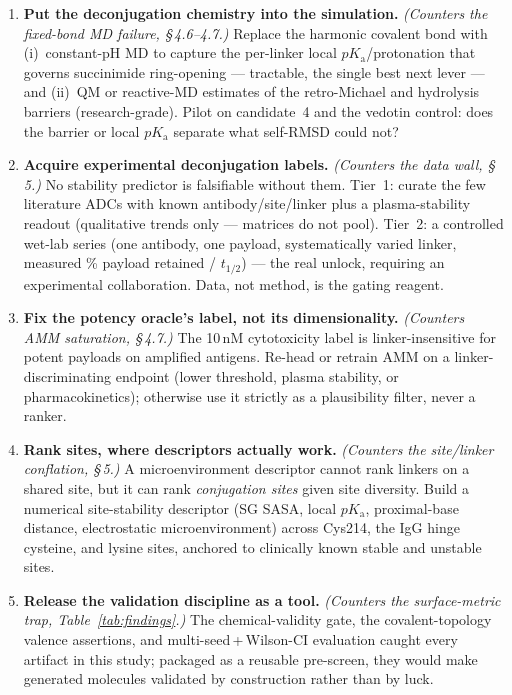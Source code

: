 \documentclass[10pt,twocolumn]{article}
\begin{document}
\begin{enumerate}[leftmargin=1.3em,itemsep=2.5pt,topsep=2pt]
\item \textbf{\color{accent}Put the deconjugation chemistry into the simulation.}
\emph{(Counters the fixed-bond MD failure, \S\,4.6--4.7.)} Replace the harmonic covalent bond with
(i)~constant-pH MD to capture the per-linker local $pK_\mathrm{a}$/protonation that governs succinimide
ring-opening --- tractable, the single best next lever --- and (ii)~QM or reactive-MD estimates of the
retro-Michael and hydrolysis barriers (research-grade). Pilot on candidate~4 and the vedotin control:
does the barrier or local $pK_\mathrm{a}$ separate what self-RMSD could not?

\item \textbf{\color{accent}Acquire experimental deconjugation labels.}
\emph{(Counters the data wall, \S\,5.)} No stability predictor is falsifiable without them. Tier~1:
curate the few literature ADCs with known antibody/site/linker plus a plasma-stability readout
(qualitative trends only --- matrices do not pool). Tier~2: a controlled wet-lab series (one antibody,
one payload, systematically varied linker, measured \% payload retained / $t_{1/2}$) --- the real
unlock, requiring an experimental collaboration. Data, not method, is the gating reagent.

\item \textbf{\color{accent}Fix the potency oracle's label, not its dimensionality.}
\emph{(Counters AMM saturation, \S\,4.7.)} The 10\,nM cytotoxicity label is linker-insensitive for
potent payloads on amplified antigens. Re-head or retrain AMM on a linker-discriminating endpoint (lower
threshold, plasma stability, or pharmacokinetics); otherwise use it strictly as a plausibility filter,
never a ranker.

\item \textbf{\color{accent}Rank sites, where descriptors actually work.}
\emph{(Counters the site/linker conflation, \S\,5.)} A microenvironment descriptor cannot rank linkers on
a shared site, but it can rank \emph{conjugation sites} given site diversity. Build a numerical
site-stability descriptor (SG SASA, local $pK_\mathrm{a}$, proximal-base distance, electrostatic
microenvironment) across Cys214, the IgG hinge cysteine, and lysine sites, anchored to clinically known
stable and unstable sites.

\item \textbf{\color{accent}Release the validation discipline as a tool.}
\emph{(Counters the surface-metric trap, Table~\ref{tab:findings}.)} The chemical-validity gate, the
covalent-topology valence assertions, and multi-seed\,+\,Wilson-CI evaluation caught every artifact in
this study; packaged as a reusable pre-screen, they would make generated molecules validated by
construction rather than by luck.
\end{enumerate}
\end{document}
